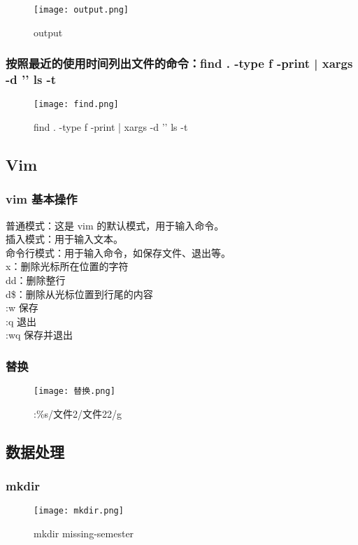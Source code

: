 \documentclass{ctexart}
\begin{document}
 \begin{figure}[h]
     \centering
     \texttt{[image: output.png]}
     \caption{output}
     \label{fig:enter-label}
 \end{figure}

\subsubsection{按照最近的使用时间列出文件的命令：find . -type f -print | xargs -d '\n' ls -t}
\begin{figure}[H]
    \centering
    \texttt{[image: find.png]}
    \caption{find . -type f -print | xargs -d '\n' ls -t}
    \label{fig:enter-label}
\end{figure}

\subsection{Vim}
\subsubsection{vim 基本操作}
普通模式：这是 vim 的默认模式，用于输入命令。\\
插入模式：用于输入文本。\\
命令行模式：用于输入命令，如保存文件、退出等。\\
x：删除光标所在位置的字符\\
dd：删除整行\\
d\$：删除从光标位置到行尾的内容\\
:w 保存\\
:q 退出\\
:wq 保存并退出\\
\subsubsection{替换}
\begin{figure}[h]
    \centering
    \texttt{[image: 替换.png]}
    \caption{:\%s/文件2/文件22/g}
    \label{fig:enter-label}
\end{figure}


\subsection{数据处理}


\subsubsection{mkdir}
\begin{figure}[h]
    \centering
    \texttt{[image: mkdir.png]}
    \caption{mkdir missing-semester}
    \label{fig:enter-label}
\end{figure}
\end{document}
